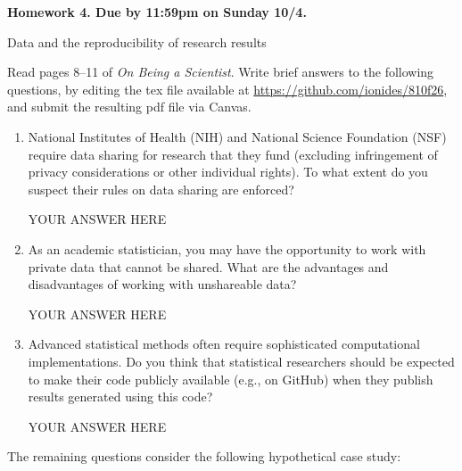 \documentclass[12pt]{article}
\begin{document}
\begin{center}\bf
Homework 4. Due by 11:59pm on Sunday 10/4.

Data and the reproducibility of research results
\end{center}
Read pages 8--11 of {\em On Being a Scientist}. Write brief answers to the following questions, by editing the tex file available at \url{https://github.com/ionides/810f26}, and submit the resulting pdf file via Canvas.

\begin{enumerate}

\item National Institutes of Health (NIH) and National Science Foundation (NSF) require data sharing for research that they fund (excluding infringement of privacy considerations or other individual rights). To what extent do you suspect their rules on data sharing are enforced?

YOUR ANSWER HERE

\item As an academic statistician, you may have the opportunity to work with private data that cannot be shared. What are the advantages and disadvantages of working with unshareable data?
  
YOUR ANSWER HERE
  
\item Advanced statistical methods often require sophisticated computational implementations. Do you think that statistical researchers should be expected to make their code publicly available (e.g., on GitHub) when they publish results generated using this code?

YOUR ANSWER HERE

\end{enumerate}
The remaining questions consider the following hypothetical case study:
\end{document}
